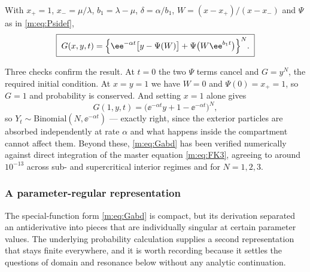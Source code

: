 \begin{proposition}
\label{m:prop:Gabd}
With $x_+=1$, $x_-=\mu/\lambda$, $b_1 = \lambda-\mu$, $\delta = \alpha/b_1$,
$W = (x-x_+)/(x-x_-)$ and $\Psi$ as in \cref{m:eq:Psidef},
\begin{equation}
\label{m:eq:Gabd}
\boxed{\;
G(x,y,t) = \Bigl\{\ee^{-\alpha t}\bigl[y-\Psi(W)\bigr] + \Psi\bigl(W\ee^{b_1t}\bigr)\Bigr\}^{N}. \;}
\end{equation}
\end{proposition}

Three checks confirm the result. At $t=0$ the two $\Psi$ terms cancel and $G=y^N$,
the required initial condition. At $x=y=1$ we have $W=0$ and $\Psi(0)=x_+=1$, so
$G=1$ and probability is conserved. And setting $x=1$ alone gives
\begin{equation*}
G(1,y,t) = \bigl(\ee^{-\alpha t}y + 1-\ee^{-\alpha t}\bigr)^N,
\end{equation*}
so $Y_t\sim\text{Binomial}(N,\ee^{-\alpha t})$ --- exactly right, since the
exterior particles are absorbed independently at rate $\alpha$ and what happens
inside the compartment cannot affect them. Beyond these, \cref{m:eq:Gabd} has been
verified numerically against direct integration of the master equation
\cref{m:eq:FK3}, agreeing to around $10^{-13}$ across sub- and supercritical interior
regimes and for $N=1,2,3$.

\subsubsection{A parameter-regular representation}
\label{m:sec:abdregular}

The special-function form \cref{m:eq:Gabd} is compact, but its derivation separated
an antiderivative into pieces that are individually singular at certain parameter
values. The underlying probability calculation supplies a second representation
that stays finite everywhere, and it is worth recording because it settles the
questions of domain and resonance below without any analytic continuation.

